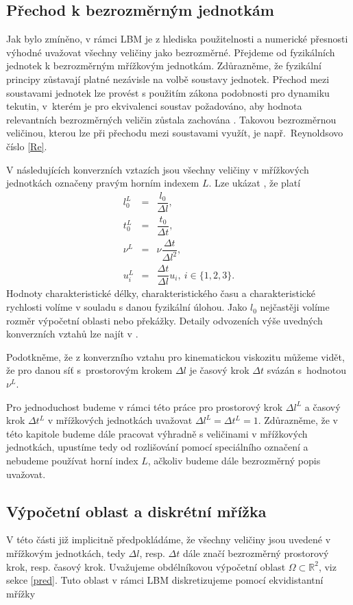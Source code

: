 \subsection{Přechod k bezrozměrným jednotkám}
Jak bylo zmíněno, v rámci LBM je z hlediska použitelnosti a numerické přesnosti výhodné uvažovat všechny veličiny jako bezrozměrné. Přejdeme od fyzikálních jednotek k bezrozměrným mřížkovým jednotkám. Zdůrazněme, že fyzikální principy zůstavají platné nezávisle na volbě soustavy jednotek. Přechod mezi soustavami jednotek lze provést s použitím zákona podobnosti pro dynamiku tekutin, v~kterém je pro ekvivalenci soustav požadováno, aby hodnota relevantních bezrozměrných veličin zůstala zachována \cite{Kruger}. Takovou bezrozměrnou veličinou, kterou lze při přechodu mezi soustavami využít, je např.~Reynoldsovo číslo \eqref{Re}.

V následujících konverzních vztazích jsou všechny veličiny v mřížkových jednotkách označeny pravým horním indexem $ L $. Lze ukázat \cite{Kruger}, že platí
\begin{eqnarray}
	l^{L}_0 &=& \dfrac{l_{0}}{\Delta l},\\[5pt]
	t^{L}_0 &=& \dfrac{t_{0}}{\Delta t},\\[5pt]
	\nu^L &=& \nu \dfrac{\Delta t}{\Delta l^{2}} 	,\\[5pt]
	u^{L}_{i} &=& \dfrac{\Delta t}{\Delta l} u_{i}, \ i \in \{1, 2, 3\}.
\end{eqnarray}
Hodnoty charakteristické délky, charakteristického času a charakteristické rychlosti volíme v souladu s danou fyzikální úlohou. Jako $ l_{0} $ nejčastěji volíme rozměr výpočetní oblasti nebo překážky. Detaily odvozeních výše uvedných konverzních vztahů lze najít v \cite{Kruger}.

Podotkněme, že z konverzního vztahu pro kinematickou viskozitu můžeme vidět, že pro danou síť s~prostorovým krokem $ \Delta l $ je časový krok $ \Delta t $ svázán s~hodnotou $ \nu^L $.

Pro jednoduchost budeme v rámci této práce pro prostorový krok $ \Delta l ^L $ a časový krok $ \Delta t ^L $ v mřížkových jednotkách uvažovat $ \Delta l ^L  =  \Delta t ^L = 1$. Zdůrazněme, že v této kapitole budeme dále pracovat výhradně s veličinami v mřížkových jednotkách, upustíme tedy od rozlišování pomocí speciálního označení a nebudeme používat horní index $ L $, ačkoliv budeme dále bezrozměrný popis uvažovat.

\subsection{Výpočetní oblast a diskrétní mřížka}
V této části již implicitně předpokládáme, že všechny veličiny jsou uvedené v mřížkovým jednotkách, tedy $ \Delta l $, resp. $ \Delta t $ dále značí bezrozměrný prostorový krok, resp. časový krok. Uvažujeme obdélníkovou výpočetní oblast $ \Omega \subset \mathbb{R}^2$, viz sekce \ref{pred}. Tuto oblast v rámci LBM diskretizujeme pomocí ekvidistantní mřížky

